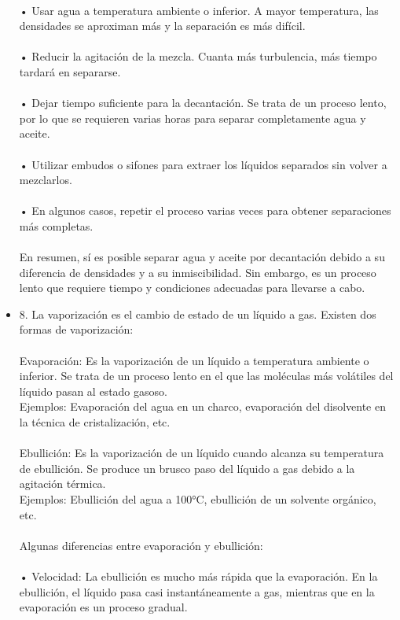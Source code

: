 \documentclass{article}
\begin{document}
\begin{itemize}
\\
• Usar agua a temperatura ambiente o inferior. A mayor temperatura, las densidades se aproximan más y la separación es más difícil.\\
\\
• Reducir la agitación de la mezcla. Cuanta más turbulencia, más tiempo tardará en separarse.\\
\\
• Dejar tiempo suficiente para la decantación. Se trata de un proceso lento, por lo que se requieren varias horas para separar completamente agua y aceite.\\
\\
• Utilizar embudos o sifones para extraer los líquidos separados sin volver a mezclarlos.\\
\\
• En algunos casos, repetir el proceso varias veces para obtener separaciones más completas.\\
\\
En resumen, sí es posible separar agua y aceite por decantación debido a su diferencia de densidades y a su inmiscibilidad. Sin embargo, es un proceso lento que requiere tiempo y condiciones adecuadas para llevarse a cabo.\\
\item{8.}
La vaporización es el cambio de estado de un líquido a gas. Existen dos formas de vaporización:\\
\\
Evaporación: Es la vaporización de un líquido a temperatura ambiente o inferior. Se trata de un proceso lento en el que las moléculas más volátiles del líquido pasan al estado gasoso.\\
Ejemplos: Evaporación del agua en un charco, evaporación del disolvente en la técnica de cristalización, etc.\\
\\
Ebullición: Es la vaporización de un líquido cuando alcanza su temperatura de ebullición. Se produce un brusco paso del líquido a gas debido a la agitación térmica.\\
Ejemplos: Ebullición del agua a 100°C, ebullición de un solvente orgánico, etc.\\
\\
Algunas diferencias entre evaporación y ebullición:\\
\\
• Velocidad: La ebullición es mucho más rápida que la evaporación. En la ebullición, el líquido pasa casi instantáneamente a gas, mientras que en la evaporación es un proceso gradual.\\

\end{itemize}
\end{document}
